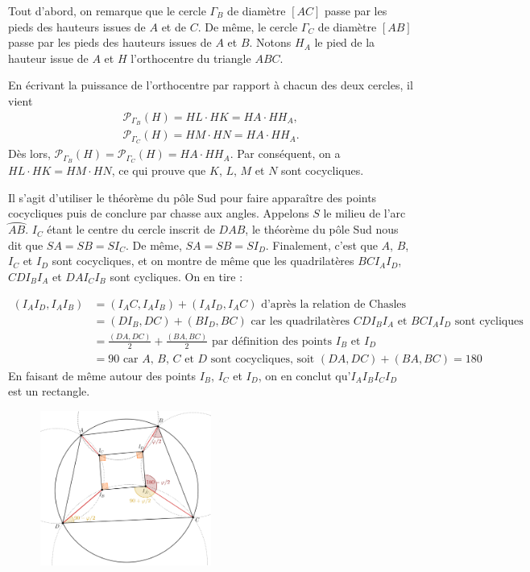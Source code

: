 \begin{sol}
Tout d'abord, on remarque que le cercle $\Gamma_B$ de diamètre $[AC]$ passe par les pieds des hauteurs issues de $A$ et de $C$. De même, le cercle $\Gamma_C$ de diamètre $[AB]$ passe par les pieds des hauteurs issues de $A$ et $B$. Notons $H_A$ le pied de la hauteur issue de $A$ et $H$ l'orthocentre du triangle $ABC$.

En écrivant la puissance de l'orthocentre par rapport à chacun des deux cercles, il vient
\begin{gather*}
    \mathcal{P}_{\Gamma_B}(H) = HL \cdot HK = HA \cdot HH_A, \\
    \mathcal{P}_{\Gamma_C}(H) = HM \cdot HN = HA \cdot HH_A.
\end{gather*}
Dès lors, $\mathcal{P}_{\Gamma_B}(H) = \mathcal{P}_{\Gamma_C}(H) = HA \cdot HH_A$. Par conséquent, on a $HL \cdot HK = HM \cdot HN$, ce qui prouve que $K$, $L$, $M$ et $N$ sont cocycliques.
\end{sol}


\begin{sol}
Il s'agit d'utiliser le théorème du pôle Sud pour faire apparaître des points cocycliques puis de conclure par chasse aux angles. Appelons $S$ le milieu de l'arc $\wideparen{AB}$. $I_C$ étant le centre du cercle inscrit de $DAB$, le théorème du pôle Sud nous dit que $SA=SB=SI_C$. De même, $SA=SB=SI_D$. Finalement, c'est que $A$, $B$, $I_C$ et $I_D$ sont cocycliques, et on montre de même que les quadrilatères $BCI_AI_D$, $CDI_BI_A$ et $DAI_CI_B$ sont cycliques. On en tire :

\begin{align*}
(I_AI_D,I_AI_B) &= (I_AC,I_AI_B)+(I_AI_D,I_AC) \text{\ \ d'après la relation de Chasles}\\
&= (DI_B,DC)+(BI_D,BC) \text{\ \ car les quadrilatères $CDI_BI_A$ et $BCI_AI_D$ sont cycliques}\\
&= \frac{(DA,DC)}{2}+\frac{(BA,BC)}{2} \text{\ \ par définition des points $I_B$ et $I_D$}\\
&= 90 \text{\ \ car $A$, $B$, $C$ et $D$ sont cocycliques, soit $(DA,DC)+(BA,BC)=180$}
\end{align*}
En faisant de même autour des points $I_B$, $I_C$ et $I_D$, on en conclut qu'$I_AI_BI_CI_D$ est un rectangle.

\begin{figure}[!h]
\centerline{\includegraphics[width=0.5\textwidth]{rectangle_X}}
\end{figure}
\end{sol}


